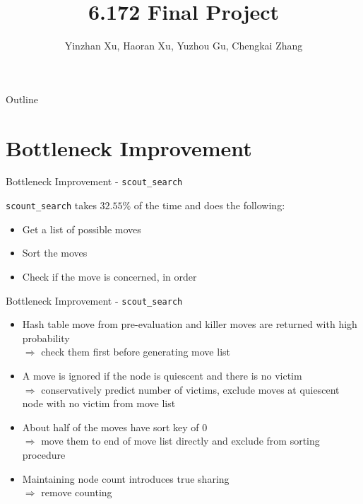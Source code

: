 \documentclass[10pt]{beamer}
\newcommand{\itema}{\item[*]}
\begin{document}
	\title{6.172 Final Project}
	\author{Yinzhan Xu, Haoran Xu, Yuzhou Gu, Chengkai Zhang}
	\date{}

	\begin{frame}
		\titlepage
	\end{frame}

    \begin{frame}{Outline}
    \tableofcontents
    \end{frame}

    \section{Bottleneck Improvement}
    \begin{frame}{Bottleneck Improvement - \tt{scout\_search}}

        {\tt scount\_search} takes $32.55\%$ of the time and does the following:
        \begin{itemize}
            \itema Get a list of possible moves
            \itema Sort the moves
            \itema Check if the move is concerned, in order
        \end{itemize}
    \end{frame}

	\begin{frame}{Bottleneck Improvement - \tt{scout\_search}}
	    \begin{itemize}
	        \itema Hash table move from pre-evaluation and killer moves are returned with high probability \\
	        $\Rightarrow$ check them first before generating move list
	        \itema A move is ignored if the node is quiescent and there is no victim\\
	        $\Rightarrow$ conservatively predict number of victims, exclude moves at quiescent node with no victim from move list
	        \itema About half of the moves have sort key of 0 \\
	        $\Rightarrow$ move them to end of move list directly and exclude from sorting procedure
	        \itema Maintaining node count introduces true sharing \\
	        $\Rightarrow$ remove counting
	    \end{itemize}


	\end{frame}
\end{document}
